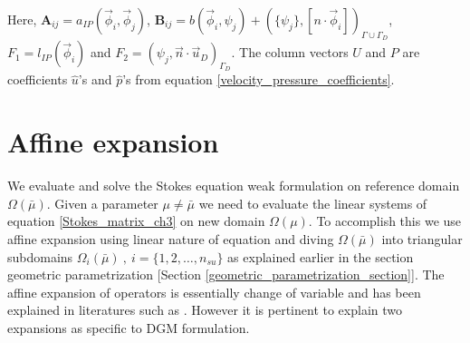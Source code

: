 \documentclass[graybox]{svmult}
\begin{document}
Here, $\bm{A}_{ij} = a_{IP} (\overrightarrow{\phi}_i,\overrightarrow{\phi}_j)$, $\bm{B}_{ij} = b(\overrightarrow{\phi}_i,\psi_j) + \left( \lbrace \psi_j \rbrace , [n \cdot \overrightarrow{\phi}_i]\right)_{\Gamma \cup \Gamma_D}$, $F_1 = l_{IP}(\overrightarrow{\phi}_i)$ and $F_2 = \left( \psi_j,\overrightarrow{n} \cdot \overrightarrow{u}_D \right)_{\Gamma_D}$. The column vectors $U$ and $P$ are coefficients $\hat{u}$'s and $\hat{p}$'s from equation \eqref{velocity_pressure_coefficients}.

\section{Affine expansion}

We evaluate and solve the Stokes equation weak formulation on reference domain $\Omega({\bar{\mu}})$. Given a parameter $\mu \neq \bar{\mu}$ we need to evaluate the linear systems of equation \eqref{Stokes_matrix_ch3} on new domain $\Omega(\mu)$. To accomplish this we use affine expansion using linear nature of equation and diving $\Omega(\bar{\mu})$ into triangular subdomains $\Omega_i(\bar{\mu}) \ , \ i = \lbrace 1,2,\ldots,n_{su} \rbrace$ as explained earlier in the section geometric parametrization [Section \ref{geometric_parametrization_section}]. The affine expansion of operators is essentially change of variable and has been explained in literatures such as \cite{CRBM}. However it is pertinent to explain two expansions as specific to DGM formulation.
\end{document}
